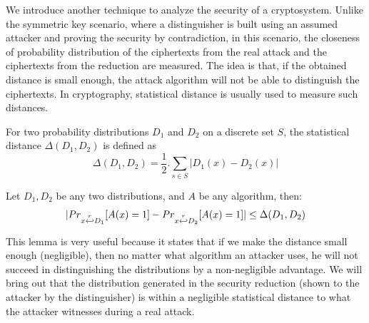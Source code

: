 \begin{description}
  We introduce another technique to analyze the security of a
  cryptosystem. Unlike the symmetric key scenario, where a
  distinguisher is built using an assumed attacker and proving the security by
  contradiction, in this scenario, the closeness of probability
  distribution of the ciphertexts from the real attack and the ciphertexts from the reduction are measured. The
  idea is that, if the obtained distance is small enough, the attack algorithm will not be able to
  distinguish the ciphertexts. In cryptography, statistical distance is usually
  used to measure such distances.
  \begin{definition}
     For two probability distributions $D_1$ and $D_2$ on
    a discrete set $S$, the statistical distance $\Delta(D_1,D_2)$ is defined as
    \[
      \Delta(D_1, D_2) = \frac{1}{2}. \sum_{s \in S}|D_1(x) - D_2(x)|
    \]
    \label{def:statisticalDistance}
  \end{definition}
  \begin{lemma}
    Let $D_1, D_2$ be any two distributions, and $A$ be any algorithm, then:
    \[
      |Pr_{x\stackrel{r}{\hookleftarrow} D_1}[A(x) = 1] - Pr_{x\stackrel{r}{\hookleftarrow} D_2}[A(x) = 1]|
      \leq \Delta(D_1, D_2)
    \]
    \label{lem:statisticalDistance}
  \end{lemma}
  This lemma is very useful because it states that if we make the distance small
  enough (negligible), then no matter what algorithm an attacker uses, he will not succeed in distinguishing the distributions by a non-negligible advantage. We will
  bring out that the distribution generated in the security reduction (shown to the attacker by the
  distinguisher) is within a negligible statistical
  distance to what the attacker witnesses during a real attack.




\end{description}
